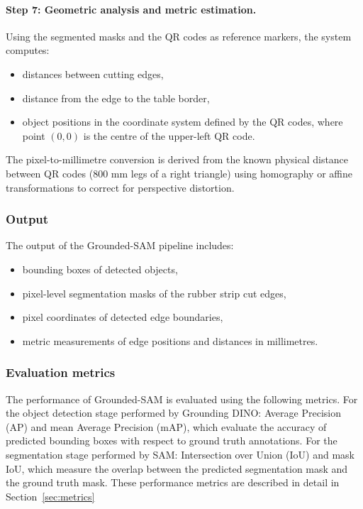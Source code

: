 \documentclass[11pt]{article}
\begin{document}
\paragraph{Step 7: Geometric analysis and metric estimation.}
Using the segmented masks and the QR codes as reference markers, the system computes:
\begin{itemize}
    \item distances between cutting edges,
    \item distance from the edge to the table border,
    \item object positions in the coordinate system defined by the QR codes, where 
    point $(0, 0)$ is the centre of the upper-left QR code.
\end{itemize}
The pixel-to-millimetre conversion is derived from the known physical distance between 
QR codes (800 mm legs of a right triangle) using homography or affine transformations 
to correct for perspective distortion.

\subsubsection{Output}

The output of the Grounded-SAM pipeline includes:
\begin{itemize}
    \item bounding boxes of detected objects,
    \item pixel-level segmentation masks of the rubber strip cut edges,
    \item pixel coordinates of detected edge boundaries,
    \item metric measurements of edge positions and distances in millimetres.
\end{itemize}

\subsubsection{Evaluation metrics}

The performance of Grounded-SAM is evaluated using the following metrics. For the object 
detection stage performed by Grounding DINO: Average Precision (AP) and mean Average 
Precision (mAP), which evaluate the accuracy of predicted bounding boxes with respect to 
ground truth annotations. For the segmentation stage performed by SAM: Intersection over 
Union (IoU) and mask IoU, which measure the overlap between the predicted segmentation 
mask and the ground truth mask. These performance metrics are described in detail in
Section~\ref{sec:metrics}
\end{document}
